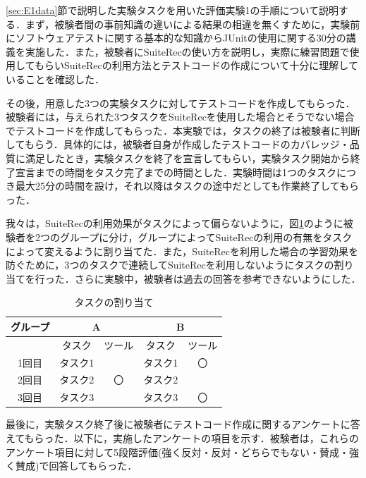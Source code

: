 \documentclass[12pt]{jarticle} %
\begin{document}
\ref{sec:E1data}節で説明した実験タスクを用いた評価実験1の手順について説明する．まず，被験者間の事前知識の違いによる結果の相違を無くすために，実験前にソフトウェアテストに関する基本的な知識からJUnitの使用に関する30分の講義を実施した．また，被験者に{\sf SuiteRec}の使い方を説明し，実際に練習問題で使用してもらい{\sf SuiteRec}の利用方法とテストコードの作成について十分に理解していることを確認した．

その後，用意した3つの実験タスクに対してテストコードを作成してもらった．被験者には，与えられた3つタスクを{\sf SuiteRec}を使用した場合とそうでない場合でテストコードを作成してもらった．本実験では，タスクの終了は被験者に判断してもらう．具体的には，被験者自身が作成したテストコードのカバレッジ・品質に満足したとき，実験タスクを終了を宣言してもらい，実験タスク開始から終了宣言までの時間をタスク完了までの時間とした．実験時間は1つのタスクにつき最大25分の時間を設け，それ以降はタスクの途中だとしても作業終了してもらった．

我々は，{\sf SuiteRec}の利用効果がタスクによって偏らないように，図\ref{assign}のように被験者を2つのグループに分け，グループによって{\sf SuiteRec}の利用の有無をタスクによって変えるように割り当てた．また，{\sf SuiteRec}を利用した場合の学習効果を防ぐために，3つのタスクで連続して{\sf SuiteRec}を利用しないようにタスクの割り当てを行った．さらに実験中，被験者は過去の回答を参考できないようにした．

\begin{table}[h]
\caption{タスクの割り当て}
\label{assign}
\begin{center}
\begin{tabular}{|c|l|l|l|c|}
\hline
グループ & \multicolumn{2}{c|}{A} & \multicolumn{2}{c|}{B} \\ \hline
& \multicolumn{1}{c|}{タスク} & \multicolumn{1}{c|}{ツール} & \multicolumn{1}{c|}{タスク} & ツール \\ \hline
1回目 & タスク1 & & タスク1 & 〇 \\ \hline
2回目 & タスク2 & \multicolumn{1}{c|}{〇} & タスク2 & \multicolumn{1}{l|}{} \\ \hline
3回目 & タスク3 & & タスク3 & 〇 \\ \hline
\end{tabular}
\end{center}
\end{table}


最後に，実験タスク終了後に被験者にテストコード作成に関するアンケートに答えてもらった．以下に，実施したアンケートの項目を示す．被験者は，これらのアンケート項目に対して5段階評価(強く反対・反対・どちらでもない・賛成・強く賛成)で回答してもらった．
\end{document}
